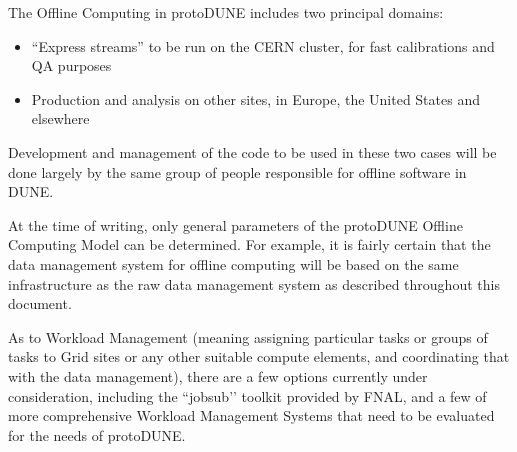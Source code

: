 The Offline Computing in protoDUNE includes two principal domains:
\begin{itemize}
\item ``Express streams'' to be run on the CERN cluster, for fast calibrations and QA purposes
\item Production and analysis on other sites, in Europe, the United States and elsewhere
\end{itemize}

\noindent
Development and management of the code to be used in these two cases will be done largely by the same group of people responsible for offline software in DUNE.

At the time of writing, only general parameters of the protoDUNE Offline Computing Model can be determined. For example, it is fairly certain that the data management system for offline computing will be based on the same infrastructure as the raw data management system as described throughout this document.

As to Workload Management (meaning assigning particular tasks or groups of tasks to Grid sites or any other suitable compute elements, and coordinating that with the data management), there are a few options currently under consideration, including the ``jobsub’’ toolkit provided by FNAL, and a few of more comprehensive Workload Management Systems that need to be evaluated for the needs of protoDUNE.
